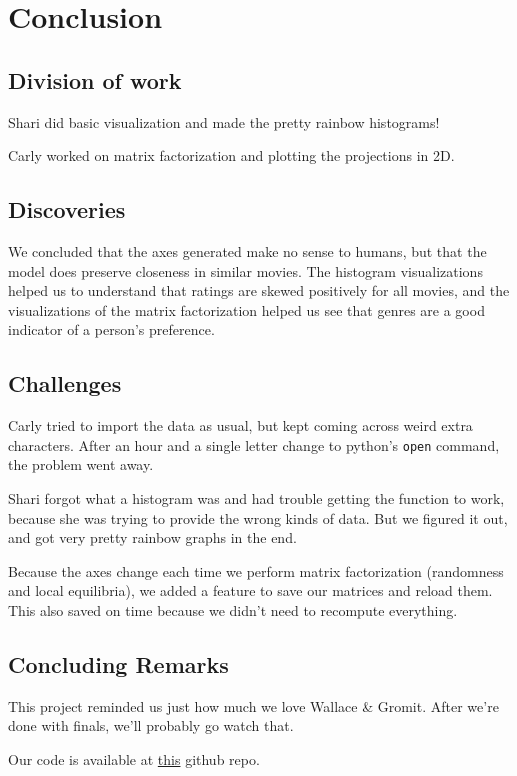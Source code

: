 \newpage

\section{Conclusion}
\subsection{Division of work}
Shari did basic visualization and made the pretty rainbow histograms!

Carly worked on matrix factorization and plotting the projections in 2D.

\subsection{Discoveries}
We concluded that the axes generated make no sense to humans, but that the model does preserve closeness in similar movies. The histogram visualizations helped us to understand that ratings are skewed positively for all movies, and the visualizations of the matrix factorization helped us see that genres are a good indicator of a person's preference.

\subsection{Challenges}
Carly tried to import the data as usual, but kept coming across weird extra characters. After an hour and a single letter change to python's {\tt open} command, the problem went away.

Shari forgot what a histogram was and had trouble getting the function to work, because she was trying to provide the wrong kinds of data. But we figured it out, and got very pretty rainbow graphs in the end.

Because the axes change each time we perform matrix factorization (randomness and local equilibria), we added a feature to save our matrices and reload them. This also saved on time because we didn't need to recompute everything.

\subsection{Concluding Remarks}
This project reminded us just how much we love Wallace \& Gromit. After we're done with finals, we'll probably go watch that.

Our code is available at \href{https://github.com/carlyrobison/MovieLensVis/}{this} github repo.







